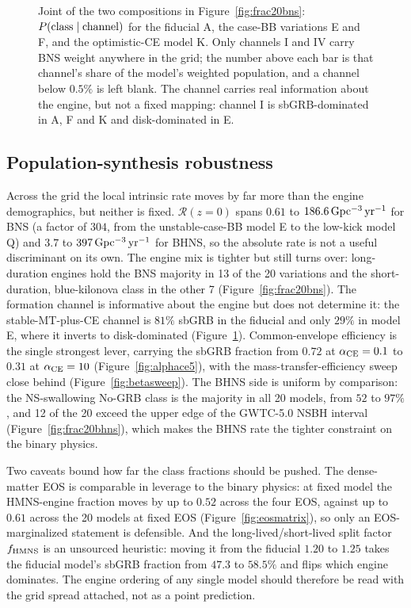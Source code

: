 \documentclass[twocolumn,apj]{openjournal}
\newcommand{\Rzero}{\mathcal{R}(z{=}0)}
\newcommand{\Gpcyr}{{\rm Gpc^{-3}\,yr^{-1}}}
\begin{document}
\begin{figure}[!tbp]
\caption{Joint of the two compositions in Figure~\ref{fig:frac20bns}:
$P({\rm class} \mid {\rm channel})$ for the fiducial A, the case-BB variations
E and F, and the optimistic-CE model K. Only channels I and IV carry BNS weight
anywhere in the grid; the number above each bar is that channel's share of the
model's weighted population, and a channel below $0.5\%$ is left blank. The
channel carries real information about the engine, but not a fixed mapping:
channel I is sbGRB-dominated in A, F and K and disk-dominated in E.
\label{fig:xtab}}
\end{figure}

\subsection{Population-synthesis robustness} \label{sec:robust}

Across the \citet{broekgaarden2021} grid the local intrinsic rate moves by far
more than the engine demographics, but neither is fixed.
$\Rzero$ spans $0.61$ to $186.6\,\Gpcyr$ for BNS (a factor of $304$, from the
unstable-case-BB model E to the low-kick model Q) and $3.7$ to $397\,\Gpcyr$ for
BHNS, so the absolute rate is not a useful discriminant on its own.
The engine mix is tighter but still turns over: long-duration engines hold the
BNS majority in 13 of the 20 variations and the short-duration, blue-kilonova
class in the other 7 (Figure~\ref{fig:frac20bns}). The formation channel is
informative about the engine but does not determine it: the stable-MT-plus-CE
channel is $81\%$ sbGRB in the fiducial and only $29\%$ in model E, where it
inverts to disk-dominated (Figure~\ref{fig:xtab}). Common-envelope efficiency
is the single strongest lever, carrying the sbGRB fraction from $0.72$ at
$\alpha_{\rm CE} = 0.1$ to $0.31$ at $\alpha_{\rm CE} = 10$
(Figure~\ref{fig:alphace5}), with the mass-transfer-efficiency sweep close
behind (Figure~\ref{fig:betasweep}). The BHNS side is uniform by comparison:
the NS-swallowing No-GRB class is the majority in all 20 models, from $52$ to
$97\%$, and 12 of the 20 exceed the upper edge of the GWTC-5.0 NSBH interval
(Figure~\ref{fig:frac20bhns}), which makes the BHNS rate the tighter constraint
on the binary physics.

Two caveats bound how far the class fractions should be pushed. The dense-matter
EOS is comparable in leverage to the binary physics: at fixed model the
HMNS-engine fraction moves by up to $0.52$ across the four EOS, against up to
$0.61$ across the 20 models at fixed EOS (Figure~\ref{fig:eosmatrix}), so only
an EOS-marginalized statement is defensible. And the long-lived/short-lived
split factor $f_{\rm HMNS}$ is an unsourced heuristic: moving it from the
fiducial $1.20$ to $1.25$ takes the fiducial model's sbGRB fraction from $47.3$
to $58.5\%$ and flips which engine dominates. The engine ordering of any single
model should therefore be read with the grid spread attached, not as a point
prediction.
\end{document}
